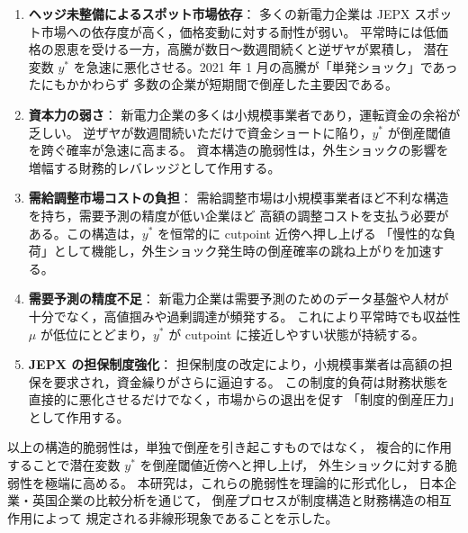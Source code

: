 \begin{enumerate}
  \item \textbf{ヘッジ未整備によるスポット市場依存}：  
  多くの新電力企業は JEPX スポット市場への依存度が高く，価格変動に対する耐性が弱い。
  平常時には低価格の恩恵を受ける一方，高騰が数日〜数週間続くと逆ザヤが累積し，
  潜在変数 $y^*$ を急速に悪化させる。2021 年 1 月の高騰が「単発ショック」であったにもかかわらず
  多数の企業が短期間で倒産した主要因である。

  \item \textbf{資本力の弱さ}：
  新電力企業の多くは小規模事業者であり，運転資金の余裕が乏しい。
  逆ザヤが数週間続いただけで資金ショートに陥り，$y^*$ が倒産閾値を跨ぐ確率が急速に高まる。
  資本構造の脆弱性は，外生ショックの影響を増幅する財務的レバレッジとして作用する。

  \item \textbf{需給調整市場コストの負担}：  
  需給調整市場は小規模事業者ほど不利な構造を持ち，需要予測の精度が低い企業ほど
  高額の調整コストを支払う必要がある。この構造は，$y^*$ を恒常的に cutpoint 近傍へ押し上げる
  「慢性的な負荷」として機能し，外生ショック発生時の倒産確率の跳ね上がりを加速する。

  \item \textbf{需要予測の精度不足}：  
  新電力企業は需要予測のためのデータ基盤や人材が十分でなく，高値掴みや過剰調達が頻発する。
  これにより平常時でも収益性 $\mu$ が低位にとどまり，$y^*$ が cutpoint に接近しやすい状態が持続する。

  \item \textbf{JEPX の担保制度強化}：  
  担保制度の改定により，小規模事業者は高額の担保を要求され，資金繰りがさらに逼迫する。
  この制度的負荷は財務状態を直接的に悪化させるだけでなく，市場からの退出を促す
  「制度的倒産圧力」として作用する。
\end{enumerate}

以上の構造的脆弱性は，単独で倒産を引き起こすものではなく，
複合的に作用することで潜在変数 $y^*$ を倒産閾値近傍へと押し上げ，
外生ショックに対する脆弱性を極端に高める。
本研究は，これらの脆弱性を理論的に形式化し，
日本企業・英国企業の比較分析を通じて，
倒産プロセスが制度構造と財務構造の相互作用によって
規定される非線形現象であることを示した。

